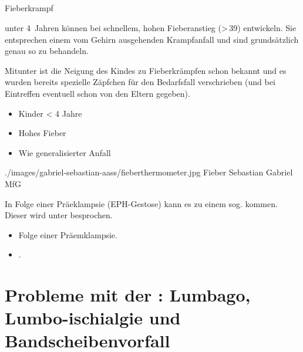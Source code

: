 



\subsection{}


\TextSlideTeaser
{Fieberkrampf}%
{\label{topic:fieberkrampf}%
%
%
%
 unter 4~Jahren können bei schnellem, hohen
Fieberanstieg ({\textgreater}\,39{\DegC}) 
 entwickeln. Sie entsprechen einem vom
Gehirn ausgehenden Krampfanfall und sind grundsätzlich genau
so zu behandeln.

Mitunter ist die Neigung des Kindes zu Fieberkrämpfen schon
bekannt und es wurden bereits spezielle Zäpfchen für den
Bedarfsfall verschrieben (und bei Eintreffen eventuell schon
von den Eltern gegeben).}%
{
\begin{itemize}
  \item Kinder {\textless} 4 Jahre
  \item Hohes Fieber
  \item Wie generalisierter Anfall
\end{itemize}}%
{./images/gabriel-sebastian-aass/fieberthermometer.jpg}%
{Fieber}%
{}%
{Sebastian Gabriel}%
{MfG}%

{%
In Folge einer Präeklampsie (EPH-Gestose)
kann es zu einem sog. 
kommen. Dieser wird unter 
besprochen.
}{
\begin{itemize}
    \item Folge einer Präemklampsie.
    \item {}.
\end{itemize}
}{}{}{}





\section{Probleme mit der : Lumbago, Lumbo-ischialgie und Bandscheibenvorfall} 
\label{topic:lumbago}

